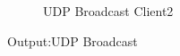 \documentclass{article}
\begin{document}
\begin{enumerate}
\begin{figure}
\begin{subfigure}{.3\textwidth}
\caption{UDP Broadcast Client2}
\label{UDPBroadcastClient2}
\end{subfigure}
\caption{Output:UDP Broadcast}
\label{fig:UDPBroadcast}
\end{figure}

\end{enumerate}
\end{document}
